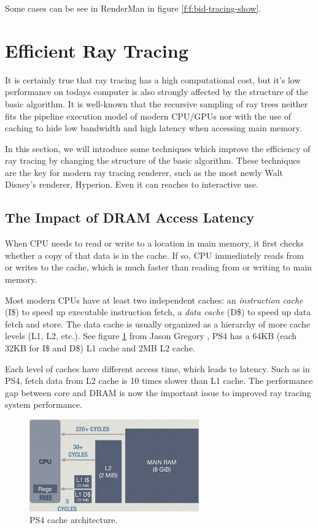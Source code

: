 Some cases can be see in RenderMan \cite{a:PathtracinginRenderMan} in figure \ref{f:f:bid-tracing-show}.




\section{Efficient Ray Tracing}
It is certainly true that ray tracing has a high computational cost, but it's low performance on todays computer is also strongly affected by the structure of the basic algorithm. It is well-known that the recursive sampling of ray trees neither fits the pipeline execution model of modern CPU/GPUs nor with the use of caching to hide low bandwidth and high latency when accessing main memory. 

In this section, we will introduce some techniques which improve the efficiency of ray tracing by changing the structure of the basic algorithm. These techniques are the key for modern ray tracing renderer, such as the most newly Walt Disney's renderer, Hyperion. Even it can reaches to interactive use.


\subsection{The Impact of DRAM Access Latency}
When CPU needs to read or write to a location in main memory, it first checks whether a copy of that data is in the cache. If so, CPU immediately reads from or writes to the cache, which is much faster than reading from or writing to main memory. 

Most modern CPUs have at least two independent caches: an \textit{instruction cache} (I\$) to speed up executable instruction fetch, a \textit{data cache} (D\$) to speed up data fetch and store. The data cache is usually organized as a hierarchy of more cache levels (L1, L2, etc.). See figure \ref{f:ps4-cache} from Jason Gregory \cite{a:DoggedDetermination:TechnologyandProcessatNaughtyDogInc.}, PS4 has a 64KB (each 32KB for I\$ and D\$) L1 cache and 2MB L2 cache.

Each level of caches have different access time, which leads to latency. Such as in PS4, fetch data from L2 cache is 10 times slower than L1 cache. The performance gap between core and DRAM is now the important issue to improved ray tracing system performance.

\begin{figure}\label{f:ps4-cache}
	\sidecaption
	\includegraphics[width=0.65\textwidth]{graphics/gi/path-14}
	\caption{PS4 cache architecture.}
\end{figure}

